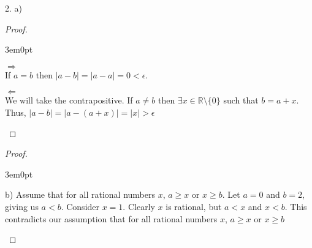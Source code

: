\documentclass[11pt]{article}
\newcommand{\bproof}{\begin{proof}
$ $ \\
\begin{adjustwidth}{3em}{0pt}
}
\newcommand{\eproof}{\end{adjustwidth}
\end{proof}}
\begin{document}
\begin{flushleft}
\newpage

2. a)

\bproof

$\Rightarrow$ \\
If $a = b$ then $|a - b| = |a - a| = 0 < \epsilon$. \\
\bigskip

$\Leftarrow$ \\
We will take the contrapositive. If $a \neq b$ then $\exists x \in \mathbb{R} \setminus \{ 0 \}$ such that $b = a + x$. Thus, $|a - b| = |a - (a + x)| = |x| > \epsilon$
\eproof

\bproof

b) Assume that for all rational numbers $x$, $a \geq x$ or $x \geq b$. Let $a = 0$ and $b = 2$, giving us $a < b$. Consider $x = 1$. Clearly $x$ is rational, but $a < x$ and $x < b$. This contradicts our assumption that for all rational numbers $x$, $a \geq x$ or $x \geq b$

\eproof
                                                                                                                                                            \newpage


\end{flushleft}
\end{document}

